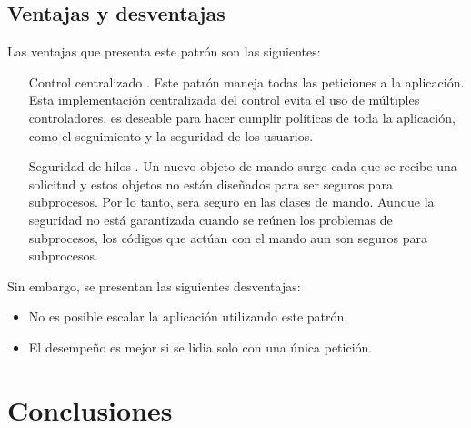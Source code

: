 \documentclass[a4paper,12pt]{article}
\begin{document}
\subsection{Ventajas y desventajas}
Las ventajas que presenta este patrón son las siguientes:
\begin{itemize}
 \item [Control centralizado]. Este patrón maneja todas las peticiones a la 
aplicación. Esta implementación centralizada del control evita el uso de 
múltiples controladores, es deseable para hacer cumplir políticas de toda la 
aplicación, como el seguimiento y la seguridad de los usuarios.
\item [Seguridad de hilos]. Un nuevo objeto de mando surge cada que se recibe 
una solicitud y estos objetos no están diseñados para ser seguros para 
subprocesos. Por lo tanto, sera seguro en las clases de mando. Aunque la 
seguridad no está garantizada cuando se reúnen los problemas de subprocesos, 
los códigos que actúan con el mando aun son seguros para subprocesos.
\end{itemize}

Sin embargo, se presentan las siguientes desventajas:
\begin{itemize}
 \item No es posible escalar la aplicación utilizando este patrón.
 \item El desempeño es mejor si se lidia solo con una única petición.
\end{itemize}
\section{Conclusiones}
\end{document}
